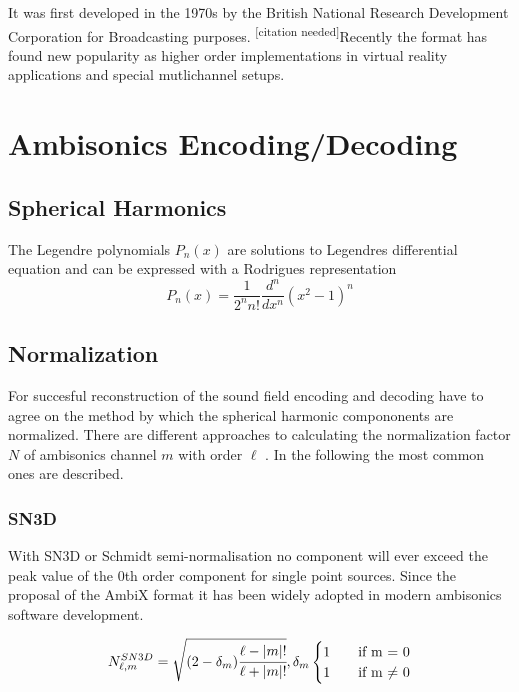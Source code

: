 \documentclass[a4paper, 10pt, twocolumn]{article}
\newcommand{\citationneeded}[1][]{\textsuperscript{\color{black} [citation needed]}}
\begin{document}
It was first developed in the 1970s by the British National Research Development Corporation for Broadcasting purposes.\citationneeded Recently the format has found new popularity as higher order implementations in virtual reality applications and special mutlichannel setups.



\section{Ambisonics Encoding/Decoding} \label{sec:AmbisonicsEncodingDecoding}

\subsection{Spherical Harmonics}

The Legendre polynomials $P_{n}(x)$ are solutions to Legendres differential equation and can be expressed with a Rodrigues representation
\[
    P_{n}(x)=\frac{1}{2^{n} n !} \frac{d^{n}}{d x^{n}}\left(x^{2}-1\right)^{n}    
\]

\subsection{Normalization}

For succesful reconstruction of the sound field encoding and decoding have to agree on the method by which the spherical harmonic compononents are normalized. There are different approaches to calculating the normalization factor $N$ of ambisonics channel $m$ with order $\ell$ . In the following the most common ones are described.

\subsubsection{SN3D}

With SN3D or Schmidt semi-normalisation no component will ever exceed the peak value of the 0th order component for single point sources. \autocite{ambix} Since the proposal of the AmbiX format it has been widely adopted in modern ambisonics software development.

\[
    N_{\ell,m}^{SN3D} = \sqrt{(2-\delta_m)\cfrac{\ell-|m|!}{\ell+|m|!}},\delta_m 
    \begin{cases} 
    1 & \quad \text{if m = 0}\\
    1 & \quad \text{if m $\neq$ 0}
    
    \end{cases}
\]
\end{document}
